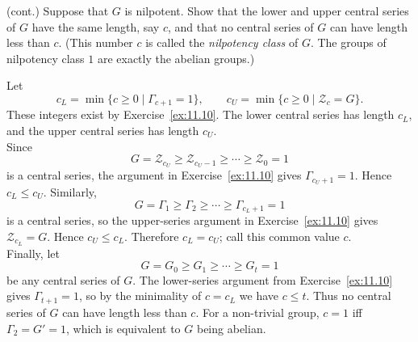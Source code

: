 \documentclass[../Odyssey_Project.tex]{subfiles}
\begin{document}
\begin{exercise}
\label{ex:11.11}
(cont.) Suppose that $G$ is nilpotent. Show that the lower and upper central series of $G$ have the same length, say $c$, and that no central series of $G$ can have length less than $c$. (This number $c$ is called the \emph{nilpotency class} of $G$. The groups of nilpotency class $1$ are exactly the abelian groups.)
\end{exercise}
\begin{solution}
    Let
    \[
        c_L=\min\{c\geq 0\mid \Gamma_{c+1}=1\},
        \qquad
        c_U=\min\{c\geq 0\mid \mathcal{Z}_c=G\}.
    \]
    These integers exist by Exercise~\ref{ex:11.10}. The lower central series has length $c_L$, and the upper central series has length $c_U$.\\
    Since
    \[
        G=\mathcal{Z}_{c_U}\geq \mathcal{Z}_{c_U-1}\geq \cdots \geq \mathcal{Z}_0=1
    \]
    is a central series, the argument in Exercise~\ref{ex:11.10} gives $\Gamma_{c_U+1}=1$. Hence $c_L\leq c_U$. Similarly,
    \[
        G=\Gamma_1\geq \Gamma_2\geq \cdots \geq \Gamma_{c_L+1}=1
    \]
    is a central series, so the upper-series argument in Exercise~\ref{ex:11.10} gives $\mathcal{Z}_{c_L}=G$. Hence $c_U\leq c_L$. Therefore $c_L=c_U$; call this common value $c$.\\
    Finally, let
    \[
        G=G_0\geq G_1\geq \cdots \geq G_t=1
    \]
    be any central series of $G$. The lower-series argument from Exercise~\ref{ex:11.10} gives $\Gamma_{t+1}=1$, so by the minimality of $c=c_L$ we have $c\leq t$. Thus no central series of $G$ can have length less than $c$. For a non-trivial group, $c=1$ iff $\Gamma_2=G'=1$, which is equivalent to $G$ being abelian.
\end{solution}
\end{document}
